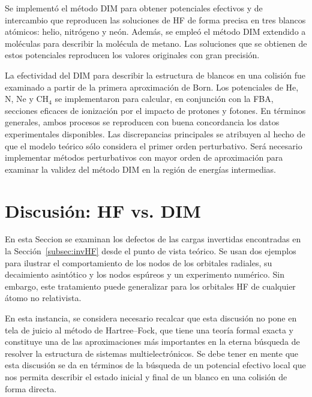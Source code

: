 Se implementó el método DIM para obtener potenciales efectivos y de 
intercambio que reproducen las soluciones de HF de forma precisa en tres 
blancos atómicos: helio, nitrógeno y neón. Además, se empleó el método 
DIM extendido a moléculas para describir la molécula de metano. Las 
soluciones que se obtienen de estos potenciales reproducen los valores
originales con gran precisión. 

La efectividad del DIM para describir la estructura de blancos en una 
colisión fue examinado a partir de la primera aproximación de Born. Los 
potenciales de He, N, Ne y CH$_4$ se implementaron para calcular, en 
conjunción con la FBA, secciones eficaces de ionización por el impacto 
de protones y fotones. En términos generales, ambos procesos se 
reproducen con buena concordancia los datos experimentales disponibles. 
Las discrepancias principales se atribuyen al hecho de que el modelo 
teórico sólo considera el primer orden perturbativo. Será necesario 
implementar métodos perturbativos con mayor orden de aproximación para 
examinar la validez del método DIM en la región de energías intermedias.


\section{Discusión: HF vs. DIM}
\label{sec:discusionHF}

En esta Seccion se examinan los defectos de las cargas invertidas 
encontradas en la Sección~\ref{subsec:invHF} desde el punto de vista 
teórico. Se usan dos ejemplos para ilustrar el comportamiento de los 
nodos de los orbitales radiales, su decaimiento asintótico y los nodos 
espúreos y un experimento numérico. Sin embargo, este tratamiento 
puede generalizar para los orbitales HF de cualquier átomo no 
relativista. 

En esta instancia, se considera necesario recalcar que esta discusión no 
pone en tela de juicio al método de Hartree--Fock, que tiene una teoría 
formal exacta y constituye una de las aproximaciones más importantes en 
la eterna búsqueda de resolver la estructura de sistemas 
multielectrónicos. Se debe tener en mente que esta discusión se da en 
términos de la búsqueda de un potencial efectivo local que nos permita 
describir el estado inicial y final de un blanco en una colisión de 
forma directa. 

